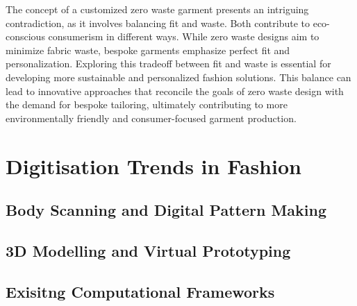 The concept of a customized zero waste garment presents an intriguing contradiction, as it involves balancing fit and waste. Both contribute to eco-conscious consumerism in different ways. While zero waste designs aim to minimize fabric waste, bespoke garments emphasize perfect fit and personalization. Exploring this tradeoff between fit and waste is essential for developing more sustainable and personalized fashion solutions. This balance can lead to innovative approaches that reconcile the goals of zero waste design with the demand for bespoke tailoring, ultimately contributing to more environmentally friendly and consumer-focused garment production.

\section{Digitisation Trends in Fashion}
\subsection{Body Scanning and Digital Pattern Making}
\subsection{3D Modelling and Virtual Prototyping}
\subsection{Exisitng Computational Frameworks}




